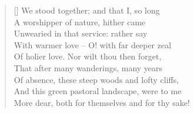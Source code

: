 \documentclass[MAIN]{subfiles}
\begin{document}
\begin{verse}[\versewidth]
We stood together; and that I, so long\\
A worshipper of nature, hither came\\
Unwearied in that service: rather say\\ 
With warmer love -- O! with far deeper zeal\\
Of holier love. Nor wilt thou then forget,\\
That after many wanderings, many years\\
Of absence, these steep woods and lofty cliffs,\\ 
And this green pastoral landscape, were to me\\
More dear, both for themselves and for thy sake!\\
\end{verse}
\end{document}

